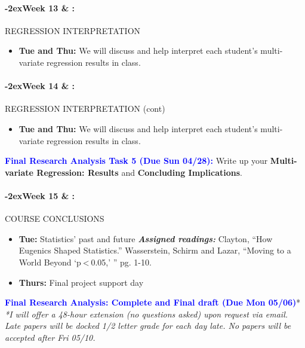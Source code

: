 \documentclass[11pt]{article}
\newcommand{\week}[1]{%
  \paragraph*{\kern-2ex\quad #1 \AdvanceDate[1]\syldate{\today} \& \AdvanceDate[2]\syldate{\today} :}%
  \ifdim\wd1=\wd\MONDAY
    \AdvanceDate[7]
  \else
    \AdvanceDate[7]
  \fi%
}
\begin{document}
\week{Week 13} REGRESSION INTERPRETATION 

\begin{itemize}
    \item []\textbf{Tue and Thu:} We will discuss and help interpret each student's multi-variate regression results in class.
\end{itemize}

\week{Week 14} REGRESSION INTERPRETATION (cont)

\begin{itemize}
    \item []\textbf{Tue and Thu:} We will discuss and help interpret each student's multi-variate regression results in class.
\end{itemize}


\noindent \textcolor{blue}{\textbf{Final Research Analysis Task 5 (Due Sun 04/28):}} Write up your \textbf{Multi-variate Regression: Results} and \textbf{Concluding Implications}.%

\week{Week 15} COURSE CONCLUSIONS
\begin{itemize}
    \item \textbf{Tue:} Statistics' past and future
        \subitem \textbf{\textit{Assigned readings:}}
        \subsubitem Clayton, ``How Eugenics Shaped Statistics.''
        \subsubitem Wasserstein, Schirm and Lazar, ``Moving to a World Beyond `p < 0.05,' '' pg. 1-10.
    \item \textbf{Thurs:} Final project support day
\end{itemize}

\noindent \textcolor{blue}{\textbf{Final Research Analysis: Complete and Final draft (Due Mon 05/06)}}*\\
\textit{*I will offer a 48-hour extension (no questions asked) upon request via email. Late papers will be docked 1/2 letter grade for each day late. No papers will be accepted after Fri 05/10.}
\end{document}
